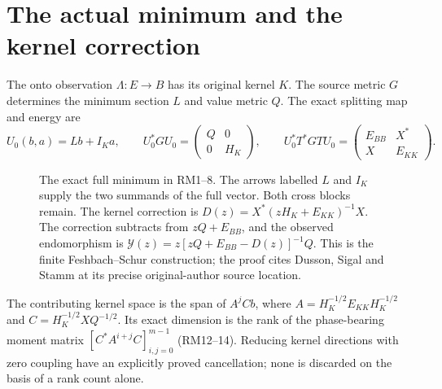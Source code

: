 \documentclass[11pt]{article}
\begin{document}
\section*{The actual minimum and the kernel correction}
The onto observation $\Lambda:E\to B$ has its original kernel $K$.
The source metric $G$ determines the minimum section $L$ and value metric $Q$.
The exact splitting map and energy are
\[
 U_0(b,a)=Lb+I_Ka,\qquad
 U_0^*GU_0=\begin{pmatrix}Q&0\\0&H_K\end{pmatrix},\qquad
 U_0^*T^*GTU_0=\begin{pmatrix}E_{BB}&X^*\\X&E_{KK}\end{pmatrix}.
\]
\begin{figure}[H]\centering
{}
\caption{The exact full minimum in RM1--8. The arrows labelled $L$ and
$I_K$ supply the two summands of the full vector. Both cross blocks remain.
The kernel correction is $D(z)=X^*(zH_K+E_{KK})^{-1}X$.
The correction subtracts from $zQ+E_{BB}$, and the observed endomorphism is
$\mathscr Y(z)=z[zQ+E_{BB}-D(z)]^{-1}Q$.
This is the finite Feshbach--Schur construction; the proof cites Dusson,
Sigal and Stamm at its precise original-author source location.}
\end{figure}
The contributing kernel space is the span of $A^jCb$, where
$A=H_K^{-1/2}E_{KK}H_K^{-1/2}$ and $C=H_K^{-1/2}XQ^{-1/2}$.
Its exact dimension is the rank of the phase-bearing moment matrix
$[C^*A^{i+j}C]_{i,j=0}^{m-1}$ (RM12--14). Reducing kernel directions with
zero coupling have an explicitly proved cancellation; none is discarded
on the basis of a rank count alone.
\clearpage
\end{document}
